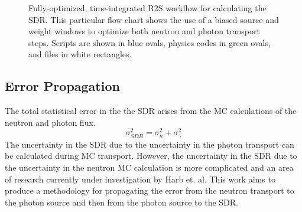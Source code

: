 \begin{figure}

	\caption[Fully optimized, time-integrated R2S workflow]
	{Fully-optimized, time-integrated R2S workflow for calculating the SDR.  This particular flow
	chart shows the use of a biased source and weight windows to
	optimize both neutron and photon transport steps.
	Scripts are shown in
	blue ovals, physics codes in green ovals, and files in white
	rectangles.}
\end{figure}


\subsection{Error Propagation}\label{sec:error}
The total statistical error in the the SDR
arises from the MC calculations of the neutron and photon flux.
\begin{equation}\label{eq:toterr}
	\sigma_{SDR}^{2} = \sigma_n^2 + \sigma_{\gamma}^2
\end{equation}
The uncertainty in the SDR due to the uncertainty in the photon transport can
be calculated during MC transport. However, the 
uncertainty in the SDR due to the uncertainty in the neutron MC
calculation is more complicated and an area of research currently under investigation by Harb et.
al.  This work aims to produce a methodology for propagating the error from the
neutron transport to the photon source and then from the photon source to the
SDR.

